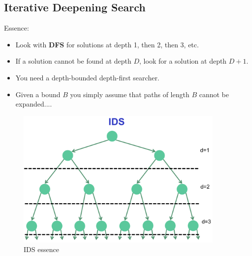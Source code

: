 \documentclass{article}
\theoremstyle{definition}
\theoremstyle{example}
\begin{document}
\subsection*{Iterative Deepening Search}
Essence:
\begin{itemize}
	\item Look with {\bf DFS} for solutions at depth 1, then 2, then 3, etc.
	\item If a solution cannot be found at depth $ D $, look for a solution at depth $ D + 1 $.
	\item You need a depth-bounded depth-first searcher.
	\item Given a bound $ B $ you simply assume that paths of length $ B  $ cannot be expanded....
\end{itemize}
\begin{figure}[H]
	\centering
	\includegraphics[width = 4in]{pic1}
	\caption{IDS essence}
\end{figure}
\end{document}
